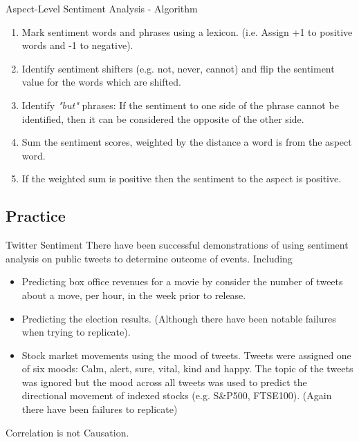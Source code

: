 \documentclass[11pt,a4paper]{article}
\begin{document}
\begin{proposition}{Aspect-Level Sentiment Analysis - Algorithm}
  \begin{enumerate}
    \item Mark sentiment words and phrases using a lexicon. (i.e. Assign +1 to positive words and -1 to negative).
    \item Identify sentiment shifters (e.g. not, never, cannot) and flip the sentiment value for the words which are shifted.
    \item Identify \textit{"but"} phrases: If the sentiment to one side of the phrase cannot be identified, then it can be considered the opposite of the other side.
    \item Sum the sentiment scores, weighted by the distance a word is from the aspect word.
    \item If the weighted sum is positive then the sentiment to the aspect is positive.
  \end{enumerate}
\end{proposition}

\subsection{Practice}

\begin{proposition}{Twitter Sentiment}
  There have been successful demonstrations of using sentiment analysis on public tweets to determine outcome of events. Including
  \begin{itemize}
    \item Predicting box office revenues for a movie by consider the number of tweets about a move, per hour, in the week prior to release.
    \item Predicting the election results. (Although there have been notable failures when trying to replicate).
    \item Stock market movements using the mood of tweets. Tweets were assigned one of six moods: Calm, alert, sure, vital, kind and happy. The topic of the tweets was ignored but the mood across all tweets was used to predict the directional movement of indexed stocks (e.g. S\&P500, FTSE100). (Again there have been failures to replicate)
  \end{itemize}
\end{proposition}

\begin{remark}{Correlation is not Causation.}

\end{remark}
\end{document}
